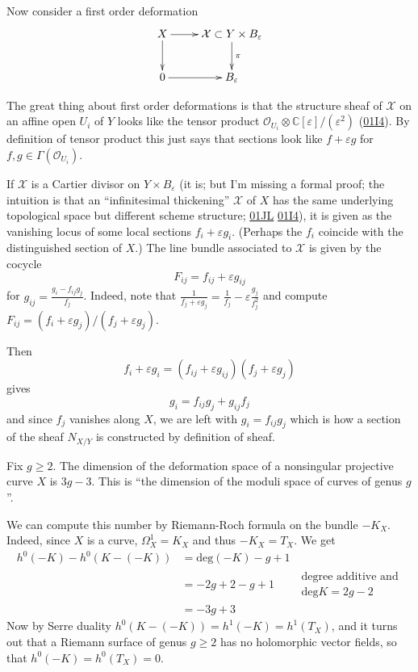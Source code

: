 Now consider a first order deformation
$$
\xymatrix{
X\ar[r]\ar[d]
&\mathcal{X}\subset Y\times
B_\varepsilon\ar[d]^\pi\\
0\ar[r]
&B_\varepsilon
}
$$

The great thing about first order
deformations
is that the structure sheaf of $\mathcal{X}$
on an affine open $U_i$ of $Y$
looks like the tensor product
$\mathcal{O}_{U_i}\otimes
\mathbb{C}[\varepsilon]/(\varepsilon^2)$
(\href{https://stacks.math.columbia.edu/tag/%
01I4}{01I4}).
By definition of tensor product this just
says
that sections look like $f+\varepsilon g$
for $f,g \in \Gamma(\mathcal{O}_{U_i})$.

If $\mathcal{X}$ is a Cartier divisor on $Y
\times B_\varepsilon$
(it is; but I'm missing a formal proof;
the intuition is that an ``infinitesimal
thickening'' $\mathcal{X}$
of $X$ has the same underlying topological
space
but different scheme structure;
\href{https://stacks.math.columbia.edu/tag/%
01JL}{01JL}
\href{https://stacks.math.columbia.edu/tag/%
01I4}{01I4}),
it is given as the vanishing locus
of some local sections $f_i+\varepsilon g_i$.
(Perhaps the $f_i$ coincide with the
distinguished
section of $X$.)
The line bundle associated to $\mathcal{X}$
is given by the cocycle
$$
F_{ij}=f_{ij}+\varepsilon g_{ij}
$$
for $g_{ij}=\frac{g_i-f_{ij}g_j}{f_j}$.
Indeed, note that
$\frac{1}{f_j+\varepsilon
g_j}=\frac{1}{f_j}-\varepsilon
\frac{g_j}{f^2_j}$
and compute $F_{ij}=(f_i+\varepsilon
g_j)/(f_j+\varepsilon g_j)$.

Then
$$
f_i+\varepsilon g_i=(f_{ij}+\varepsilon
g_{ij})(f_j+\varepsilon g_j)
$$
gives
$$
g_i=f_{ij}g_j+g_{ij}f_j
$$
and since $f_j$ vanishes along $X$,
we are left with $g_i=f_{ij}g_j$
which is how a section of the sheaf $N_{X/Y}$
is constructed by definition of sheaf.


\begin{example}
\label{example-modul-space-nonsi-riema}
\begin{reference}
\cite[Example 3.1]{continued-fractions}
\end{reference}
Fix $g \geq 2$. The dimension of the
deformation space of a nonsingular
projective curve $X$ is $3g-3$. This is ``the
dimension of the moduli space of
curves of genus $g$''.

We can compute this number by Riemann-Roch
formula on the bundle $-K_X$.
Indeed, since $X$ is a curve,
$\Omega_X^1=K_X$ and thus $-K_X=T_X$. We get
$$
\begin{aligned}
h^0(-K)-h^0(K-(-K))&=\text{deg}(-K)-g+1\\
&=-2g+2-g+1\qquad \substack{\text{degree
additive and}\\ \text{deg}K=2g-2}\\
&=-3g+3
\end{aligned}
$$
Now by Serre duality
$h^0(K-(-K))=h^1(-K)=h^1(T_X)$, and it turns
out that a
Riemann surface of genus $g \geq 2$ has no
holomorphic vector fields, so that
$h^0(-K)=h^0(T_X)=0$.
\end{example}


